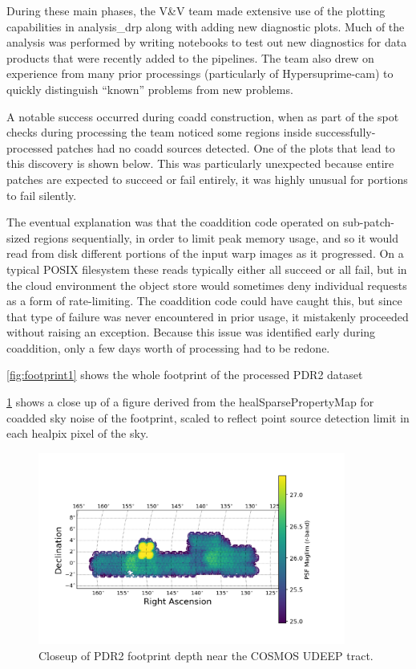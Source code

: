 During these main phases, the V\&V team made extensive use of the plotting capabilities in
analysis\_drp along with adding new diagnostic plots. Much of the analysis was performed by writing
notebooks to test out new diagnostics for data products that were recently added to the pipelines.
The team also drew on experience from many prior processings (particularly of Hypersuprime-cam) to
quickly distinguish ``known'' problems from new problems.

A notable success occurred during coadd construction, when as part of the spot checks during
processing the team noticed some regions inside successfully-processed patches had no coadd sources
detected. One of the plots that lead to this discovery is shown below. This was particularly
unexpected because entire patches are expected to succeed or fail entirely, it was highly unusual
for portions to fail silently.

The eventual explanation was that the coaddition code operated on sub-patch-sized regions
sequentially, in order to limit peak memory usage, and so it would read from disk different portions
of the input warp images as it progressed. On a typical POSIX filesystem these reads typically
either all succeed or all fail, but in the cloud environment the object store would sometimes deny
individual requests as a form of rate-limiting. The coaddition code could have caught this, but
since that type of failure was never encountered in prior usage, it mistakenly proceeded without
raising an exception. Because this issue was identified early during coaddition, only a few days
worth of processing had to be redone.



\ref{fig:footprint1} shows the whole footprint of the processed PDR2
dataset

 \ref{fig:footprint0} shows a close up of a figure derived from the healSparsePropertyMap for coadded sky noise of the footprint, scaled to reflect point
 source detection limit in each healpix pixel of the sky.

 \begin{figure}[h]
 \includegraphics[width=0.9\textwidth]{r-band-cosmos-pdr2.png}
	 \caption{Closeup of PDR2 footprint depth near the COSMOS UDEEP tract.  \label{fig:footprint0}}
 \end{figure}


